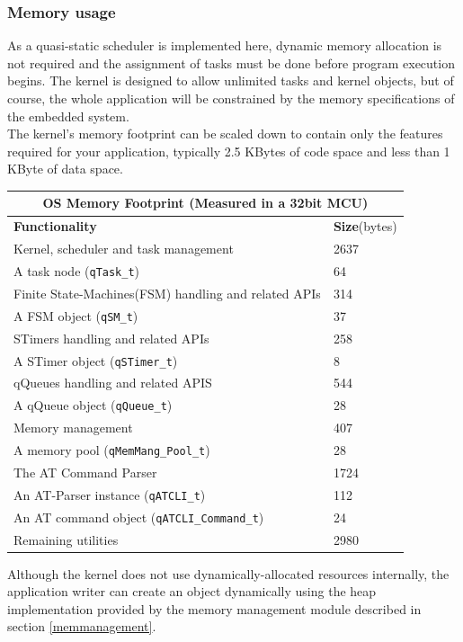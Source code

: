 \documentclass{article}
\begin{document}
\subsubsection{Memory usage}
As a quasi-static scheduler is implemented here, dynamic memory allocation is not required and the assignment of tasks must be done before program execution begins.
The kernel is designed to allow unlimited tasks and kernel objects, but of course, the whole application will be constrained by the memory specifications of the embedded system. \\
The kernel's memory footprint can be scaled down to contain only the features required for your application, typically 2.5 KBytes of code space and less than 1 KByte of data space. \\

\begin{tabular}{ |p{10cm}||p{1.5cm}|  }
 \hline
 \multicolumn{2}{|c|}{ \textbf{OS Memory Footprint} \scriptsize{(Measured in a 32bit MCU)}} \\
 \hline
 \textbf{Functionality} & \textbf{Size}\scriptsize{(bytes)}\\
 \hline
 Kernel, scheduler and task management& 2637\\
 A task node ({\lstinline!qTask_t!}) & 64\\
 Finite State-Machines(FSM) handling and related APIs& 314\\
 A FSM object ({\lstinline!qSM_t!}) & 37 \\
 STimers handling and related APIs & 258\\
 A STimer object ({\lstinline!qSTimer_t!})& 8\\
 qQueues handling and related APIS & 544\\
 A qQueue object ({\lstinline!qQueue_t!}) & 28\\
 Memory management & 407\\
 A memory pool ({\lstinline!qMemMang_Pool_t!}) & 28 \\ 
 The AT Command Parser & 1724\\
 An AT-Parser instance ({\lstinline!qATCLI_t!})& 112\\
 An AT command object ({\lstinline!qATCLI_Command_t!})& 24\\
 Remaining utilities& 2980\\
 \hline
\end{tabular}

 \begin{tcolorbox}
 \HandRight Although the kernel does not use dynamically-allocated resources internally, the application writer can create an object dynamically using the heap implementation provided by the memory management module described in section \ref{memmanagement}.
 \end{tcolorbox}
\end{document}
